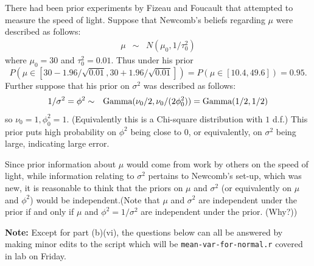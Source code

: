 \documentclass{article}
\newcommand{\1}{\mathbf{1}}
\begin{document}
There had been prior experiments by Fizeau and Foucault that attempted to measure the speed of light. Suppose that Newcomb's beliefs regarding $\mu$ were described as follows:
\begin{eqnarray*}
    \mu &\sim& N(\mu_0,1/\tau_0^2)
\end{eqnarray*}
where $\mu_0=30$ and $\tau_0^2=0.01$. Thus under his prior 
$$P( \mu \in [30 -1.96/\sqrt{0.01}, 30 +1.96/\sqrt{0.01}])  = P( \mu \in [10.4, 49.6]) = 0.95.$$ 
Further suppose that his prior on $\sigma^2$ was described as follows:
\begin{eqnarray*}
    1/\sigma^2 = \phi^2 &\sim & \hbox{Gamma}(\nu_0/2, \nu_0/(2\phi_0^2)) = \hbox{Gamma}(1/2, 1/2)
\end{eqnarray*}
so $\nu_0=1, \phi_0^2 =1$. (Equivalently this is a Chi-square distribution with $1$ d.f.) This prior puts high probability on $\phi^2$ being close to $0$, or equivalently, on $\sigma^2$ being large, indicating large error.

Since prior information about $\mu$ would come from work by others on the speed of light, while information relating to $\sigma^2$ pertains to Newcomb's set-up, which was new, it is reasonable to think that the priors on $\mu$ and $\sigma^2$ (or equivalently on $\mu$ and $\phi^2$) would be independent.(Note that $\mu$ and $\sigma^2$ are independent under the prior if and only if $\mu$ and $\phi^2 = 1/\sigma^2$ are independent under the prior. (Why?))

{\bf Note:} Except for part (b)(vi), the questions below can all be answered by making minor edits to the script which will be {\tt mean-var-for-normal.r} covered in lab on Friday.
\end{document}
